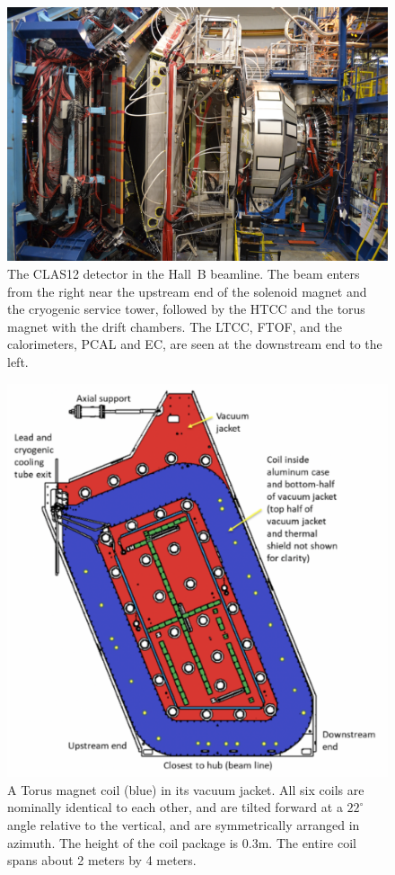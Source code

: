 \documentclass[final,3p,twocolumn]{elsarticle}
\begin{document}
\begin{figure}[bhtp!]
\centerline{\includegraphics[width=1.4\columnwidth]{CLAS12_photo-1.jpg}}
\caption{The CLAS12 detector in the Hall~B beamline. The beam enters from the right near the upstream end of
  the solenoid magnet and the cryogenic service tower, followed by the HTCC and the torus magnet with the drift
  chambers. The LTCC, FTOF, and the calorimeters, PCAL and EC, are seen at the downstream end to the left.}
\label{clas12-photo}
\end{figure}


\begin{figure}[th!]
\centerline{\includegraphics[width=1.0\columnwidth]{Torus-coil.png}}
\caption{A Torus magnet coil (blue) in its vacuum jacket. All six coils are nominally identical to each
other, and are tilted forward at a $22^\circ$ angle relative to the vertical, and are symmetrically arranged in azimuth. 
The height of the coil package is 0.3m. The entire coil spans about 2 meters by 4 meters.  }
\label{coil-shape}
\end{figure}
\end{document}
